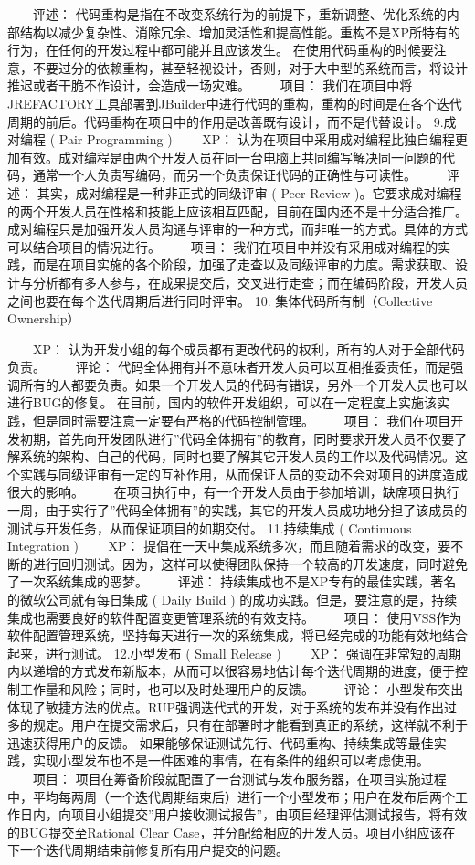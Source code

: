 \documentclass[UTF8]{../computerUniverse}
\begin{document}
　　评述： 代码重构是指在不改变系统行为的前提下，重新调整、优化系统的内部结构以减少复杂性、消除冗余、增加灵活性和提高性能。重构不是XP所特有的行为，在任何的开发过程中都可能并且应该发生。
在使用代码重构的时候要注意，不要过分的依赖重构，甚至轻视设计，否则，对于大中型的系统而言，将设计推迟或者干脆不作设计，会造成一场灾难。
　　项目： 我们在项目中将JREFACTORY工具部署到JBuilder中进行代码的重构，重构的时间是在各个迭代周期的前后。代码重构在项目中的作用是改善既有设计，而不是代替设计。
9.成对编程 ( Pair Programming )
　　XP： 认为在项目中采用成对编程比独自编程更加有效。成对编程是由两个开发人员在同一台电脑上共同编写解决同一问题的代码，通常一个人负责写编码，而另一个负责保证代码的正确性与可读性。
　　评述： 其实，成对编程是一种非正式的同级评审 ( Peer Review )。它要求成对编程的两个开发人员在性格和技能上应该相互匹配，目前在国内还不是十分适合推广。成对编程只是加强开发人员沟通与评审的一种方式，而非唯一的方式。具体的方式可以结合项目的情况进行。
　　项目： 我们在项目中并没有采用成对编程的实践，而是在项目实施的各个阶段，加强了走查以及同级评审的力度。需求获取、设计与分析都有多人参与，在成果提交后，交叉进行走查；而在编码阶段，开发人员之间也要在每个迭代周期后进行同时评审。
10. 集体代码所有制（Collective Ownership）

　　XP： 认为开发小组的每个成员都有更改代码的权利，所有的人对于全部代码负责。
　　评论： 代码全体拥有并不意味者开发人员可以互相推委责任，而是强调所有的人都要负责。如果一个开发人员的代码有错误，另外一个开发人员也可以进行BUG的修复。
在目前，国内的软件开发组织，可以在一定程度上实施该实践，但是同时需要注意一定要有严格的代码控制管理。
　　项目： 我们在项目开发初期，首先向开发团队进行”代码全体拥有”的教育，同时要求开发人员不仅要了解系统的架构、自己的代码，同时也要了解其它开发人员的工作以及代码情况。这个实践与同级评审有一定的互补作用，从而保证人员的变动不会对项目的进度造成很大的影响。
　　在项目执行中，有一个开发人员由于参加培训，缺席项目执行一周，由于实行了”代码全体拥有”的实践，其它的开发人员成功地分担了该成员的测试与开发任务，从而保证项目的如期交付。
11.持续集成 ( Continuous Integration )
　　XP： 提倡在一天中集成系统多次，而且随着需求的改变，要不断的进行回归测试。因为，这样可以使得团队保持一个较高的开发速度，同时避免了一次系统集成的恶梦。
　　评述： 持续集成也不是XP专有的最佳实践，著名的微软公司就有每日集成 ( Daily Build ) 的成功实践。但是，要注意的是，持续集成也需要良好的软件配置变更管理系统的有效支持。
　　项目： 使用VSS作为软件配置管理系统，坚持每天进行一次的系统集成，将已经完成的功能有效地结合起来，进行测试。
12.小型发布 ( Small Release )
　　XP： 强调在非常短的周期内以递增的方式发布新版本，从而可以很容易地估计每个迭代周期的进度，便于控制工作量和风险；同时，也可以及时处理用户的反馈。
　　评论： 小型发布突出体现了敏捷方法的优点。RUP强调迭代式的开发，对于系统的发布并没有作出过多的规定。用户在提交需求后，只有在部署时才能看到真正的系统，这样就不利于迅速获得用户的反馈。
如果能够保证测试先行、代码重构、持续集成等最佳实践，实现小型发布也不是一件困难的事情，在有条件的组织可以考虑使用。
　　项目： 项目在筹备阶段就配置了一台测试与发布服务器，在项目实施过程中，平均每两周（一个迭代周期结束后）进行一个小型发布；用户在发布后两个工作日内，向项目小组提交”用户接收测试报告”，由项目经理评估测试报告，将有效的BUG提交至Rational Clear Case，并分配给相应的开发人员。项目小组应该在下一个迭代周期结束前修复所有用户提交的问题。
\end{document}
